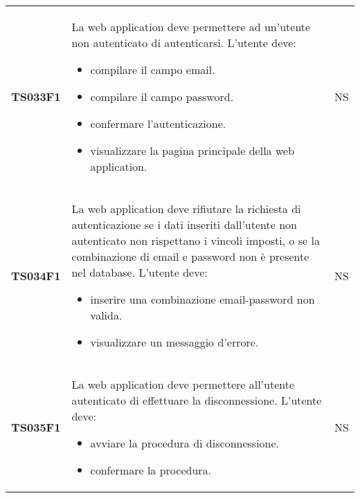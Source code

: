 \documentclass[../piano-di-qualifica.tex]{subfiles}
\begin{document}
\begin{centering}
\begin{longtable}[H]{>{\centering\bfseries}m{3cm} >{}p{10cm} >{\centering\arraybackslash}m{3cm}}
    TS033F1            & La web application deve permettere ad un'utente non autenticato di autenticarsi. \newline
    L'utente deve:
    \begin{itemize}
      \item compilare il campo email.
      \item compilare il campo password.
      \item confermare l'autenticazione.
      \item visualizzare la pagina principale della web application.
    \end{itemize}
                       & NS                                                                                                                                                                                                                                                               \\
    TS034F1            & La web application deve rifiutare la richiesta di autenticazione se i dati inseriti dall'utente non autenticato non rispettano i vincoli imposti, o se la combinazione di email e password non è presente nel database. \newline
    L'utente deve:
    \begin{itemize}
      \item inserire una combinazione email-password non valida.
      \item visualizzare un messaggio d'errore.
    \end{itemize}
                       & NS                                                                                                                                                                                                                                                               \\
    TS035F1            & La web application deve permettere all'utente autenticato di effettuare la disconnessione. \newline
    L'utente deve:
    \begin{itemize}
      \item avviare la procedura di disconnessione.
      \item confermare la procedura.
    \end{itemize}
                       & NS                                                                                                                                                                                                                                                               \\

\end{longtable}
\end{centering}
\end{document}
